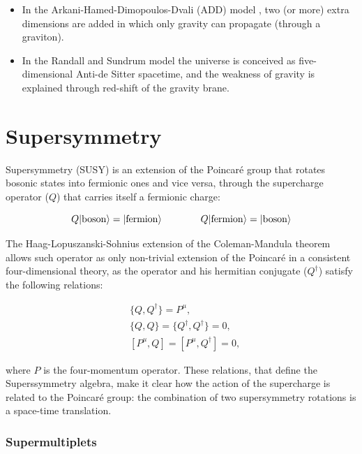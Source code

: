 \begin{itemize}
\item In the Arkani-Hamed-Dimopoulos-Dvali (ADD) model \cite{ArkaniHamed:1998rs}, two (or more) extra dimensions are added in which only gravity can propagate (through a graviton).
\item In the Randall and Sundrum model \cite{PhysRevLett.83.3370} the universe is conceived as five-dimensional Anti-de Sitter spacetime, and the weakness of gravity is explained through red-shift of the gravity brane.
\end{itemize}


\section{Supersymmetry}
\label{sec:smsusy:susy}

Supersymmetry (SUSY) \cite{Wess:1974tw}\cite{Salam:1974ig} is an extension of the Poincar\'e group that rotates bosonic states into fermionic ones and vice versa, through the supercharge operator ($Q$) that carries itself a fermionic charge: 

\begin{equation}
Q |{\rm boson}\rangle = |{\rm fermion }\rangle \qquad\qquad
Q |{\rm fermion}\rangle = |{\rm boson }\rangle 
\end{equation}

The Haag-Lopuszanski-Sohnius extension of the Coleman-Mandula theorem \cite{HAAG1975257} allows such operator as only non-trivial extension of the Poincar\'e in a consistent four-dimensional theory, as the operator and his hermitian conjugate ($Q^\dagger$) satisfy the following relations:

\begin{equation}
\begin{aligned}
&\{ Q, Q^\dagger \} = P^\mu ,  \\
&\{ Q,Q \} = \{ Q^\dagger , Q^\dagger \} = 0 ,  \\
&[ P^\mu , Q  ] = [P^\mu, Q^\dagger ] = 0 ,
\label{eq:susyalgth}
\end{aligned}
\end{equation}

where $P$ is the four-momentum operator. These relations, that define the Superssymmetry algebra, make it clear how the action of the supercharge is related to the Poincar\'e group: the combination of two supersymmetry rotations is a space-time translation.

\subsubsection{Supermultiplets}

